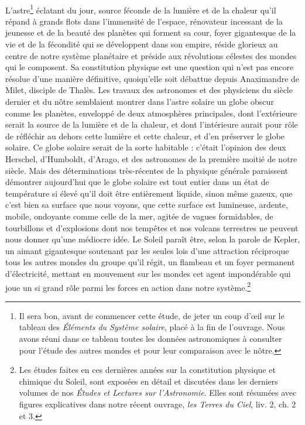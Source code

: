 \documentclass[a4paper, 11pt, oneside, landscape]{article}
\begin{document}
\paragraph{}
L'astre\footnote{Il sera bon, avant de commencer cette étude, de jeter un coup d'œil sur le tableau des \emph{Éléments du Système solaire}, placé à la fin de l'ouvrage. Nous avons réuni dans ce tableau toutes les données astronomiques à consulter pour l'étude des autres mondes et pour leur comparaison avec le nôtre.} éclatant du jour, source féconde de la lumière et de la chaleur qu'il répand à grands flots dans l'immensité de l'espace, rénovateur incessant de la jeunesse et de la beauté des planètes qui forment sa cour, foyer gigantesque de la vie et de la fécondité qui se développent dans son empire, réside glorieux au centre de notre système planétaire et préside aux révolutions célestes des mondes qui le composent. Sa constitution physique est une question qui n'est pas encore résolue d'une manière définitive, quoiqu'elle soit débattue depuis Anaximandre de Milet, disciple de Thalès. Les travaux des astronomes et des physiciens du siècle dernier et du nôtre semblaient montrer dans l'astre solaire un globe obscur comme les planètes, enveloppé de deux atmosphères principales, dont l'extérieure serait la source de la lumière et de la chaleur, et dont l'intérieure aurait pour rôle de réfléchir au dehors cette lumière et cette chaleur, et d'en préserver le globe solaire. Ce globe solaire serait de la sorte habitable : c'était l'opinion des deux Herschel, d'Humboldt, d'Arago, et des astronomes de la première moitié de notre siècle. Mais des déterminations très-récentes de la physique générale paraissent démontrer aujourd'hui que le globe solaire est tout entier dans un état de température si élevé qu'il doit être entièrement liquide, sinon même gazeux, que c'est bien sa surface que nous voyons, que cette surface est lumineuse, ardente, mobile, ondoyante comme celle de la mer, agitée de vagues formidables, de tourbillons et d'explosions dont nos tempêtes et nos volcans terrestres ne peuvent nous donner qu'une médiocre idée. Le Soleil paraît être, selon la parole de Kepler, un aimant gigantesque soutenant par les seules lois d'une attraction réciproque tous les autres mondes du groupe qu'il régit, un flambeau et un foyer permanent d'électricité, mettant en mouvement sur les mondes cet agent impondérable qui joue un si grand rôle parmi les forces en action dans notre système.\footnote{Les études faites en ces dernières années sur la constitution physique et chimique du Soleil, sont exposées en détail et discutées dans les derniers volumes de nos \emph{Études et Lectures sur l'Astronomie}. Elles sont résumées avec figures explicatives dans notre récent ouvrage, \emph{les Terres du Ciel}, liv. 2, ch. 2 et 3.}
\end{document}
